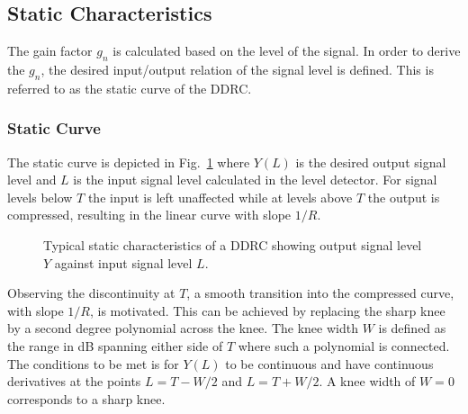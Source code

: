 \documentclass[../main2.tex]{subfiles}
\providecommand{\rootdir}{..}
\begin{document}
\FloatBarrier
\subsection{Static Characteristics}
The gain factor $g_n$ is calculated based on the level of the signal. In order to derive the $g_n$, the desired input/output relation of the signal level is defined. This is referred to as the static curve of the DDRC.

\subsubsection{Static Curve}
The static curve is depicted in Fig.~\ref{fig:typical_static_detailed} where $Y(L)$ is the desired output signal level and $L$ is the input signal level calculated in the level detector. For signal levels below $T$ the input is left unaffected while at levels above $T$ the output is compressed, resulting in the linear curve with slope $1/R$.  

\begin{figure}
\centerline{}
\caption{Typical static characteristics of a DDRC showing output signal level $Y$ against input signal level $L$.}
\label{fig:typical_static_detailed}
\end{figure}

Observing the discontinuity at $T$, a smooth transition into the compressed curve, with slope $1/R$, is motivated. This can be achieved by replacing the sharp knee by a second degree polynomial across the knee\cite{frindle1996implementation}\cite{reiss2012tutorial}. The knee width $W$ is defined as the range in dB spanning either side of $T$ where such a polynomial is connected. The conditions to be met is for $Y(L)$ to be continuous and have continuous derivatives at the points $L=T-W/2$ and $L=T+W/2$. A knee width of $W=0$ corresponds to a sharp knee. 
\end{document}
